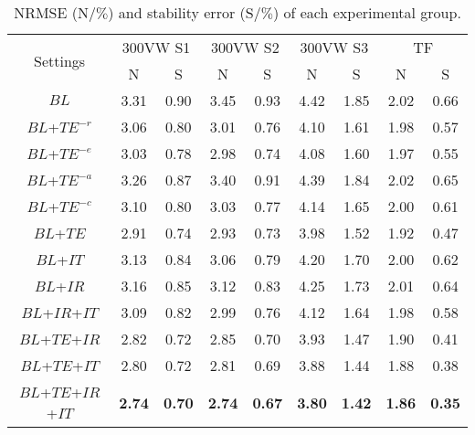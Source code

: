 \documentclass[review]{elsarticle}
\begin{document}
\begin{table}[h]
	\centering
	\renewcommand\tabcolsep{1.8pt}
	\begin{tabular}{*{9}{c}}
		\toprule
		\multirow{2}{*}{Settings} &\multicolumn{2}{c}{300VW S1}&\multicolumn{2}{c}{300VW S2}&\multicolumn{2}{c}{300VW S3}
		&\multicolumn{2}{c}{TF} \\ \cline{2-9}
		& N & S &N &S & N & S & N & S \\
		\midrule
		$BL$&  3.31  &  0.90  &   3.45 &  0.93 &   4.42  &  1.85  &    2.02  &  0.66 \\ 
		\midrule
		$BL$+$TE^{-r}$& 3.06   & 0.80 & 3.01  & 0.76 &  4.10  &  1.61 & 1.98   & 0.57 \\ 
		$BL$+$TE^{-e}$& 3.03   & 0.78  &  2.98  & 0.74 &  4.08  & 1.60  &  1.97  & 0.55 \\  
		$BL$+$TE^{-a}$& 3.26   &  0.87 &  3.40   &  0.91 &   4.39  &  1.84 &   2.02  & 0.65  \\  
		$BL$+$TE^{-c}$&  3.10  & 0.80 & 3.03  & 0.77 & 4.14   & 1.65 & 2.00  &  0.61 \\ 
		$BL$+$TE$& 2.91   & 0.74  &  2.93  & 0.73  &  3.98  & 1.52  &  1.92   & 0.47 \\  
		\midrule
		$BL$+$IT$&  3.13  & 0.84  & 3.06  & 0.79 & 4.20   &  1.70 &  2.00 & 0.62 \\ 
		$BL$+$IR$&  3.16   & 0.85  & 3.12  &  0.83 & 4.25   & 1.73  &  2.01  & 0.64 \\ 
		$BL$+$IR$+$IT$&  3.09  & 0.82  & 2.99  &  0.76 &  4.12  & 1.64 &  1.98   & 0.58 \\ 
		\midrule
		$BL$+$TE$+$IR$&  2.82  & 0.72  &  2.85 & 0.70 &  3.93  & 1.47  &  1.90   & 0.41  \\ 
		$BL$+$TE$+$IT$&  2.80  &  0.72 &  2.81 & 0.69 &  3.88  & 1.44  & 1.88  &  0.38 \\ 
		$BL$+$TE$+$IR$+$IT$ & \textbf{2.74} & \textbf{0.70} & \textbf{2.74}  & \textbf{0.67} & \textbf{3.80}  & \textbf{1.42}  &  \textbf{1.86}  & \textbf{0.35} \\
		\bottomrule
	\end{tabular}
	\caption{NRMSE (N$/\%$) and stability error (S$/\%$)  of each experimental group.}

	\label{abla}
\end{table}
\end{document}

